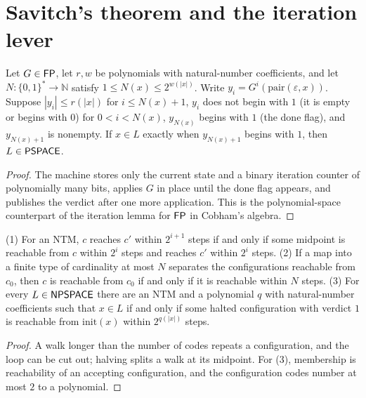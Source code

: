 \section{Savitch's theorem and the iteration lever}

\begin{lemma}
  \label{lem:space-iterate}
  \leanok
  Let $G \in \mathsf{FP}$, let $r, w$ be polynomials with natural-number
  coefficients, and let $N : \{0,1\}^* \to \mathbb{N}$ satisfy
  $1 \le N(x) \le 2^{w(|x|)}$. Write $y_i = G^i(\mathrm{pair}(\varepsilon, x))$.
  Suppose $|y_i| \le r(|x|)$ for $i \le N(x) + 1$, $y_i$ does not begin with
  $1$ (it is empty or begins with $0$) for $0 < i < N(x)$, $y_{N(x)}$ begins
  with $1$ (the done flag), and $y_{N(x)+1}$ is nonempty. If $x \in L$ exactly
  when $y_{N(x)+1}$ begins with $1$, then $L \in \mathsf{PSPACE}$.
\end{lemma}
\begin{proof}
  \leanok
  The machine stores only the current state and a binary iteration counter of
  polynomially many bits, applies $G$ in place until the done flag appears, and
  publishes the verdict after one more application. This is the
  polynomial-space counterpart of the iteration lemma for $\mathsf{FP}$ in Cobham's
  algebra.
\end{proof}

\begin{lemma}
  \label{lem:space-savitch-recursion}
  \leanok
  (1) For an NTM, $c$ reaches $c'$ within $2^{i+1}$ steps if and only if some
  midpoint is reachable from $c$ within $2^i$ steps and reaches $c'$ within
  $2^i$ steps. (2) If a map into a finite type of cardinality at most $N$
  separates the configurations reachable from $c_0$, then $c$ is reachable
  from $c_0$ if and only if it is reachable within $N$ steps. (3) For every
  $L \in \mathsf{NPSPACE}$ there are an NTM and a polynomial $q$ with
  natural-number coefficients such that $x \in L$ if and only if some halted
  configuration with verdict $1$ is reachable from $\mathrm{init}(x)$ within
  $2^{q(|x|)}$ steps.
\end{lemma}
\begin{proof}
  \leanok
  A walk longer than the number of codes repeats a configuration, and the loop
  can be cut out; halving splits a walk at its midpoint. For (3), membership
  is reachability of an accepting configuration, and the configuration codes
  number at most $2$ to a polynomial.
\end{proof}


